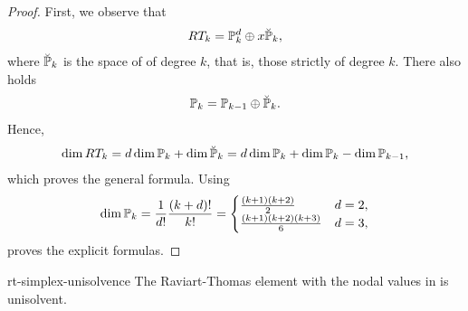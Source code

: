 \begin{proof}
  First, we observe that
  \begin{gather*}
    RT_k = \P_k^d \oplus x\breve\P_k,
  \end{gather*}
  where $\breve \P_k$ is the space of  of degree $k$, that is, those strictly of degree
  $k$. There also holds
  \begin{gather*}
    \P_{k} = \P_{k-1} \oplus \breve \P_k.
  \end{gather*}
  Hence,
  \begin{gather*}
    \dim RT_k = d \dim \P_k + \dim\breve\P_k = d \dim \P_k + \dim \P_k
    - \dim \P_{k-1},
  \end{gather*}
  which proves the general formula. Using
  \begin{gather}
    \dim\P_k
    =\frac1{d!} \frac{(k+d)!}{k!}
    =
    \begin{cases}
      \frac{(k+1)(k+2)}{2} & d=2,\\
      \frac{(k+1)(k+2)(k+3)}{6} & d=3,
    \end{cases}
  \end{gather}
  proves the explicit formulas.
\end{proof}

\begin{Lemma}{rt-simplex-unisolvence}
  The Raviart-Thomas element with the nodal values in
   is unisolvent.
\end{Lemma}

